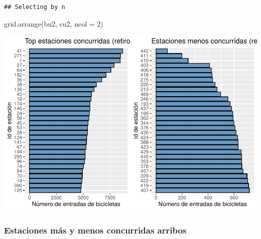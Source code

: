 \documentclass[
]{article}
\newenvironment{Shaded}{\begin{snugshade}}{\end{snugshade}}
\newcommand{\AttributeTok}[1]{\textcolor[rgb]{0.77,0.63,0.00}{#1}}
\newcommand{\DecValTok}[1]{\textcolor[rgb]{0.00,0.00,0.81}{#1}}
\newcommand{\FunctionTok}[1]{\textcolor[rgb]{0.00,0.00,0.00}{#1}}
\newcommand{\NormalTok}[1]{#1}
\begin{document}
\begin{verbatim}
## Selecting by n
\end{verbatim}

\begin{Shaded}
\begin{Highlighting}[]
\FunctionTok{grid.arrange}\NormalTok{(bu2, cu2, }\AttributeTok{ncol =} \DecValTok{2}\NormalTok{)}
\end{Highlighting}
\end{Shaded}

\includegraphics{Ecobici_files/figure-latex/unnamed-chunk-7-1.pdf}

\hypertarget{estaciones-muxe1s-y-menos-concurridas-arribos}{%
\subsubsection{Estaciones más y menos concurridas
arribos}\label{estaciones-muxe1s-y-menos-concurridas-arribos}}
\end{document}
